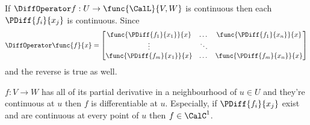 \begin{remark}
    If \(\DiffOperator f: U \to \func{\CalL}{V,W}\) is continuous then each \(\PDiff{f_i}{x_j}\) is continuous. Since
    \begin{equation*}
        \DiffOperator \func{f}{x} = \begin{bmatrix}
            \func{\PDiff{f_1}{x_1}}{x} & \dots  & \func{\PDiff{f_1}{x_n}}{x} \\
            \vdots                     & \ddots &                            \\
            \func{\PDiff{f_m}{x_1}}{x} & \dots  & \func{\PDiff{f_m}{x_n}}{x}
        \end{bmatrix}
    \end{equation*}
    and the reverse is true as well.
\end{remark}

\begin{theorem}
    \(f : V \to W\) has all of its partial derivative in a neighbourhood of \(u \in U\) and they're continuous at \(u\) then \(f\) is differentiable at \(u\). Especially, if \(\PDiff{f_i}{x_j}\) exist and are continuous at every point of \(u\) then \(f \in \CalC^1\).
\end{theorem}


